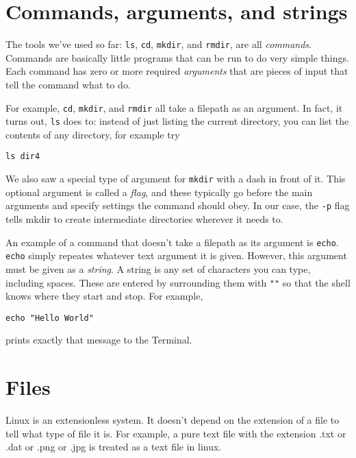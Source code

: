 \documentclass[aps,showpacs,prd,notitlepage,preprintnumbers,amsmath,amssymb,letterpaper]{revtex4}
\begin{document}
\section{Commands, arguments, and strings}
The tools we've used so far: \verb|ls|, \verb|cd|, \verb|mkdir|, and \verb|rmdir|, are all \textit{commands}.
Commands are basically little programs that can be run to do very simple things.
Each command has zero or more required \textit{arguments} that are pieces of input that tell the command what to do.

For example, \verb|cd|, \verb|mkdir|, and \verb|rmdir| all take a filepath as an argument.
In fact, it turns out, \verb|ls| does to: instead of just listing the current directory, you can list the contents of any directory, for example try
\begin{verbatim}
ls dir4
\end{verbatim}

We also saw a special type of argument for \verb|mkdir| with a dash in front of it. This optional argument is called a \textit{flag}, and these typically go before the main arguments and specify settings the command should obey.
In our case, the \verb|-p| flag tells mkdir to create intermediate directories wherever it needs to.

An example of a command that doesn't take a filepath as its argument is \verb|echo|. \verb|echo| simply repeates whatever text argument it is given.
However, this argument must be given as a \textit{string}. A string is any set of characters you can type, including spaces. These are entered by surrounding them with \verb|""| so that the shell knows where they start and stop.
For example,

\begin{verbatim}
echo "Hello World"
\end{verbatim}

prints exactly that message to the Terminal.

\section{Files}

Linux is an extensionless system. It doesn't depend on the extension of
a file to tell what type of file it is. For example, a pure text file with
the extension .txt or .dat or .png or .jpg is treated as a text file in linux.
\end{document}
